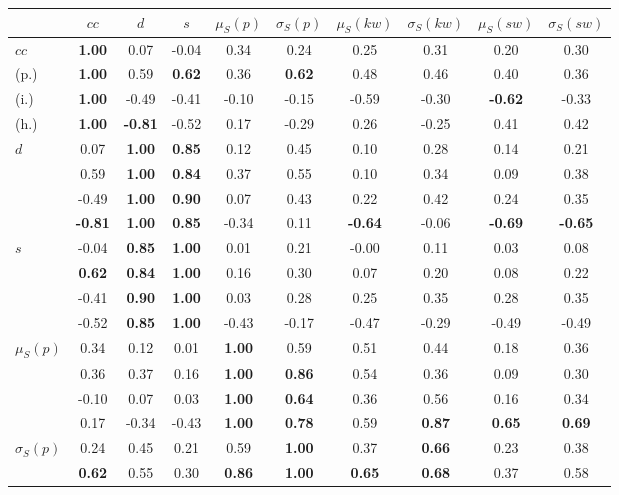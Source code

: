 \begin{table*}[h!]
\begin{center}
\begin{tabular}{| l || c | c | c | c | c | c | c | c | c |}\hline
 & $cc$ & $d$ & $s$ & $\mu_S(p)$ & $\sigma_S(p)$ & $\mu_S(kw)$ & $\sigma_S(kw)$ & $\mu_S(sw)$ & $\sigma_S(sw)$ \\\hline\hline
$cc$ & {\bf 1.00} & 0.07 & -0.04 & 0.34 & 0.24 & 0.25 & 0.31 & 0.20 & 0.30 \\
(p.) & {\bf 1.00} & 0.59 & {\bf 0.62} & 0.36 & {\bf 0.62} & 0.48 & 0.46 & 0.40 & 0.36 \\
(i.) & {\bf 1.00} & -0.49 & -0.41 & -0.10 & -0.15 & -0.59 & -0.30 & {\bf -0.62} & -0.33 \\
(h.) & {\bf 1.00} & {\bf -0.81} & -0.52 & 0.17 & -0.29 & 0.26 & -0.25 & 0.41 & 0.42 \\\hline
$d$ & 0.07 & {\bf 1.00} & {\bf 0.85} & 0.12 & 0.45 & 0.10 & 0.28 & 0.14 & 0.21 \\
 & 0.59 & {\bf 1.00} & {\bf 0.84} & 0.37 & 0.55 & 0.10 & 0.34 & 0.09 & 0.38 \\
 & -0.49 & {\bf 1.00} & {\bf 0.90} & 0.07 & 0.43 & 0.22 & 0.42 & 0.24 & 0.35 \\
 & {\bf -0.81} & {\bf 1.00} & {\bf 0.85} & -0.34 & 0.11 & {\bf -0.64} & -0.06 & {\bf -0.69} & {\bf -0.65} \\\hline
$s$ & -0.04 & {\bf 0.85} & {\bf 1.00} & 0.01 & 0.21 & -0.00 & 0.11 & 0.03 & 0.08 \\
 & {\bf 0.62} & {\bf 0.84} & {\bf 1.00} & 0.16 & 0.30 & 0.07 & 0.20 & 0.08 & 0.22 \\
 & -0.41 & {\bf 0.90} & {\bf 1.00} & 0.03 & 0.28 & 0.25 & 0.35 & 0.28 & 0.35 \\
 & -0.52 & {\bf 0.85} & {\bf 1.00} & -0.43 & -0.17 & -0.47 & -0.29 & -0.49 & -0.49 \\\hline
$\mu_S(p)$ & 0.34 & 0.12 & 0.01 & {\bf 1.00} & 0.59 & 0.51 & 0.44 & 0.18 & 0.36 \\
 & 0.36 & 0.37 & 0.16 & {\bf 1.00} & {\bf 0.86} & 0.54 & 0.36 & 0.09 & 0.30 \\
 & -0.10 & 0.07 & 0.03 & {\bf 1.00} & {\bf 0.64} & 0.36 & 0.56 & 0.16 & 0.34 \\
 & 0.17 & -0.34 & -0.43 & {\bf 1.00} & {\bf 0.78} & 0.59 & {\bf 0.87} & {\bf 0.65} & {\bf 0.69} \\\hline
$\sigma_S(p)$ & 0.24 & 0.45 & 0.21 & 0.59 & {\bf 1.00} & 0.37 & {\bf 0.66} & 0.23 & 0.38 \\
 & {\bf 0.62} & 0.55 & 0.30 & {\bf 0.86} & {\bf 1.00} & {\bf 0.65} & {\bf 0.68} & 0.37 & 0.58 \\

\end{tabular}
\end{center}
\end{table*}

